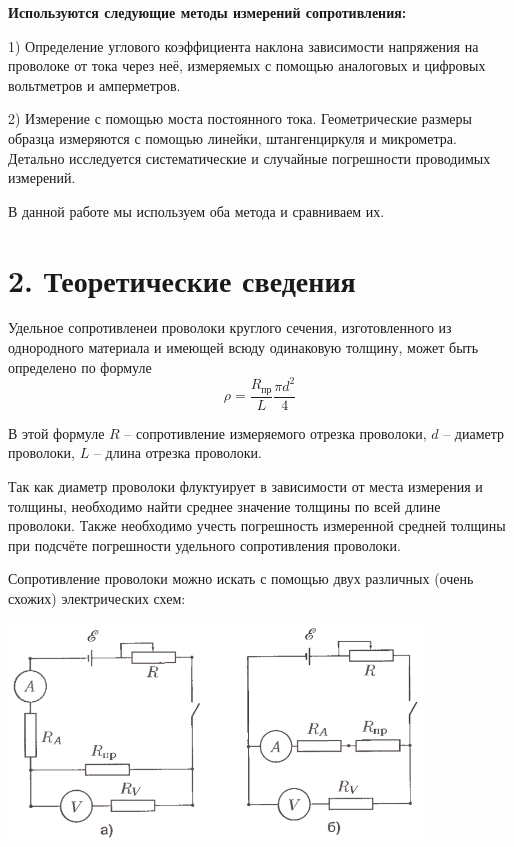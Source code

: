 
\textbf{Используются следующие методы измерений сопротивления:} 

1) Определение углового коэффициента наклона зависимости напряжения на проволоке от тока через неё, измеряемых с помощью аналоговых и цифровых вольтметров и амперметров.

2) Измерение с помощью моста постоянного тока. Геометрические размеры образца измеряются с помощью линейки, штангенциркуля и микрометра. Детально исследуется систематические и случайные погрешности проводимых измерений.

В данной работе мы используем оба метода и сравниваем их.\\


\section*{2. Теоретические сведения}

Удельное сопротивленеи проволоки круглого сечения, изготовленного из однородного материала и имеющей всюду одинаковую толщину, может быть определено по формуле
\[\rho = \frac{R_{\text{пр}}}{L} \frac{\pi d^2}{4}\]

В этой формуле $R$ -- сопротивление измеряемого отрезка проволоки, $d$ -- диаметр проволоки, $L$ -- длина отрезка проволоки.

Так как диаметр проволоки флуктуирует в зависимости от места измерения и толщины, необходимо найти среднее значение толщины по всей длине проволоки. Также необходимо учесть погрешность измеренной средней толщины при подсчёте погрешности удельного сопротивления проволоки.

Сопротивление проволоки можно искать с помощью двух различных (очень схожих) электрических схем:
\begin{center}
    {\includegraphics[width=11cm]{1}}
\end{center}

